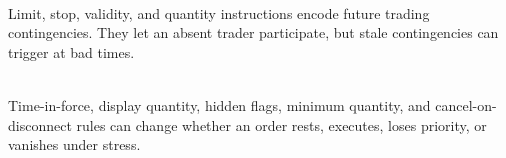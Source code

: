 \begin{principle} \\
Limit, stop, validity, and quantity instructions encode future trading contingencies. They let an absent trader participate, but stale contingencies can trigger at bad times.
\end{principle}

\begin{caveat} \\
Time-in-force, display quantity, hidden flags, minimum quantity, and cancel-on-disconnect rules can change whether an order rests, executes, loses priority, or vanishes under stress.
\end{caveat}
